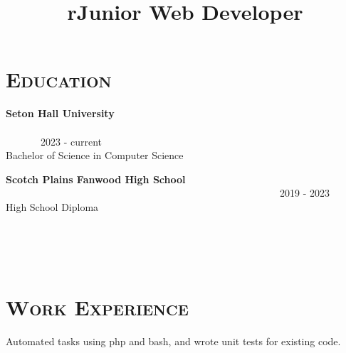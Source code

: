 \begin{resume}





\section{\textsc{Education}}

\textbf{Seton Hall University} \ \ \ \ \ \ \ \ \ \ \ \ \ \ \ \ \ \ \ \ \ \ \ \ \ \ \ \ \ \ \ \ \ \ \ \ \ \ \ \ \ \ \ \ \ \ \ \ \ \ \ \ \ \ \ \ \ \ \ \ \ \ \ \ \ \ \ \ \ \ \ \ \ \ \ \ \ \ \ 2023 - current \\
Bachelor of Science in Computer Science

\textbf{Scotch Plains Fanwood High School} \ \ \ \ \ \ \ \ \ \ \ \ \ \ \ \ \ \ \ \ \ \ \ \ \ \ \ \ \ \ \ \ \ \ \ \ \ \ \ \ \ \ \ \ \ \ \ \ \ \ \ \ \ \ \ 2019 - 2023 \\ 
High School Diploma




\begin{formatb}
  \title{r}\\
  \\
  \body\\
\end{formatb}

\section{\textsc{Work Experience}}

\title{Junior Web Developer}
\begin{position}
Automated tasks using php and bash, and wrote unit tests for existing code.
\end{position}





\end{resume}

